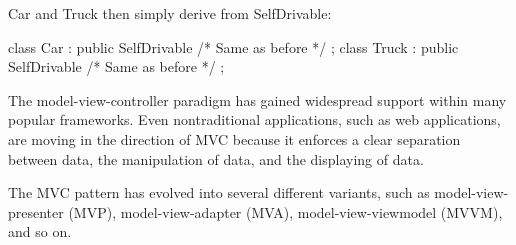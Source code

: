 Car and Truck then simply derive from SelfDrivable:

\begin{cpp}
class Car : public SelfDrivable { /* Same as before */ };
class Truck : public SelfDrivable { /* Same as before */ };
\end{cpp}


The model-view-controller paradigm has gained widespread support within many popular frameworks. Even nontraditional applications, such as web applications, are moving in the direction of MVC because it enforces a clear separation between data, the manipulation of data, and the displaying of data.

The MVC pattern has evolved into several different variants, such as model-view-presenter (MVP), model-view-adapter (MVA), model-view-viewmodel (MVVM), and so on.





